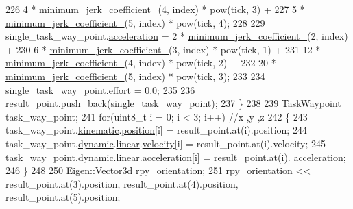 \begin{DoxyCode}
226              4 * \hyperlink{classrobotis__manipulator_1_1_task_trajectory_a19c6e0525c29db0b3bad7950baa74e42}{minimum\_jerk\_coefficient\_}(4, index) * pow(tick, 3) +
227              5 * \hyperlink{classrobotis__manipulator_1_1_task_trajectory_a19c6e0525c29db0b3bad7950baa74e42}{minimum\_jerk\_coefficient\_}(5, index) * pow(tick, 4);
228 
229     single\_task\_way\_point.\hyperlink{structrobotis__manipulator_1_1_point_adb49f1fbcc0eaa7f530c54fdf0ede836}{acceleration} = 2 * 
      \hyperlink{classrobotis__manipulator_1_1_task_trajectory_a19c6e0525c29db0b3bad7950baa74e42}{minimum\_jerk\_coefficient\_}(2, index) +
230              6 * \hyperlink{classrobotis__manipulator_1_1_task_trajectory_a19c6e0525c29db0b3bad7950baa74e42}{minimum\_jerk\_coefficient\_}(3, index) * pow(tick, 1) +
231              12 * \hyperlink{classrobotis__manipulator_1_1_task_trajectory_a19c6e0525c29db0b3bad7950baa74e42}{minimum\_jerk\_coefficient\_}(4, index) * pow(tick, 2) +
232              20 * \hyperlink{classrobotis__manipulator_1_1_task_trajectory_a19c6e0525c29db0b3bad7950baa74e42}{minimum\_jerk\_coefficient\_}(5, index) * pow(tick, 3);
233 
234     single\_task\_way\_point.\hyperlink{structrobotis__manipulator_1_1_point_add1a7019fc87cc2ac9bdf033372a9bb6}{effort} = 0.0;
235 
236     result\_point.push\_back(single\_task\_way\_point);
237   \}
238 
239   \hyperlink{structrobotis__manipulator_1_1_pose}{TaskWaypoint} task\_way\_point;
241   \textcolor{keywordflow}{for}(uint8\_t i = 0; i < 3; i++)        \textcolor{comment}{//x ,y ,z}
242   \{
243     task\_way\_point.\hyperlink{structrobotis__manipulator_1_1_pose_a7215a37d50e62643f1523d3fa40a36e9}{kinematic}.\hyperlink{structrobotis__manipulator_1_1_kinematic_pose_a8700e7ae2388242cf540e884d52fd97a}{position}[i] = result\_point.at(i).position;
244     task\_way\_point.\hyperlink{structrobotis__manipulator_1_1_pose_a8accf10d21933e07ade2728fcccf4ae6}{dynamic}.\hyperlink{structrobotis__manipulator_1_1_dynamic_pose_a45f314d8e2d3f78a4bc9c2aa72f0badc}{linear}.\hyperlink{structrobotis__manipulator_1_1_dynamicvector_a6bbccf8316887a8da3cd6aa065f3beac}{velocity}[i] = result\_point.at(i).velocity;
245     task\_way\_point.\hyperlink{structrobotis__manipulator_1_1_pose_a8accf10d21933e07ade2728fcccf4ae6}{dynamic}.\hyperlink{structrobotis__manipulator_1_1_dynamic_pose_a45f314d8e2d3f78a4bc9c2aa72f0badc}{linear}.\hyperlink{structrobotis__manipulator_1_1_dynamicvector_afc83eba2d67af4c23150a08824f0f01e}{acceleration}[i] = result\_point.at(i).
      acceleration;
246   \}
248 
250   Eigen::Vector3d rpy\_orientation;
251   rpy\_orientation << result\_point.at(3).position, result\_point.at(4).position, result\_point.at(5).position;

\end{DoxyCode}
